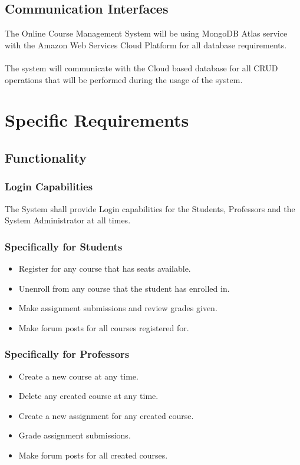 \documentclass[12pt, a4]{report}
\begin{document}
\section{Communication Interfaces}
The Online Course Management System will be using MongoDB Atlas service with the Amazon Web Services Cloud Platform for all database requirements.
\\\\
The system will communicate with the Cloud based database for all CRUD operations that will be performed during the usage of the system.


\chapter{Specific Requirements}


\section{Functionality}

\subsection{Login Capabilities}
The System shall provide Login capabilities for the Students, Professors and the System Administrator at all times.

\subsection{Specifically for Students}
\begin{itemize}
    \item Register for any course that has seats available.
    \item Unenroll from any course that the student has enrolled in.
    \item Make assignment submissions and review grades given.
    \item Make forum posts for all courses registered for.
\end{itemize}

\subsection{Specifically for Professors}
\begin{itemize}
    \item Create a new course at any time.
    \item Delete any created course at any time.
    \item Create a new assignment for any created course.
    \item Grade assignment submissions.
    \item Make forum posts for all created courses.
\end{itemize}
\end{document}

